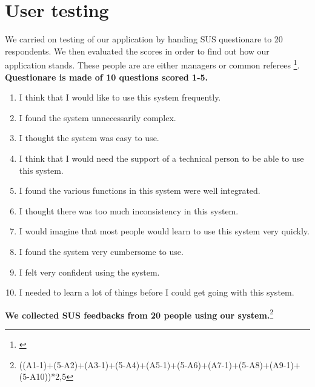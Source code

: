 \section{User testing}
We carried on testing of our application by handing SUS questionare to 20 respondents. We then evaluated the scores in order to find out how our application stands. These people are are either managers or common referees \footnote{\cite{SUSDesc}}. 
\newline
\textbf{Questionare is made of 10 questions scored 1-5.}
\begin{enumerate}
    \item I think that I would like to use this system frequently.
    \item I found the system unnecessarily complex.
    \item I thought the system was easy to use.
    \item I think that I would need the support of a technical person to be able to use this system.
    \item I found the various functions in this system were well integrated.
    \item I thought there was too much inconsistency in this system.
    \item I would imagine that most people would learn to use this system very quickly.
    \item I found the system very cumbersome to use.
    \item I felt very confident using the system.
    \item I needed to learn a lot of things before I could get going with this system.
\end{enumerate}
\textbf{We collected SUS feedbacks from 20 people using our system.}\footnote{((A1-1)+(5-A2)+(A3-1)+(5-A4)+(A5-1)+(5-A6)+(A7-1)+(5-A8)+(A9-1)+(5-A10))*2,5}
\newline
